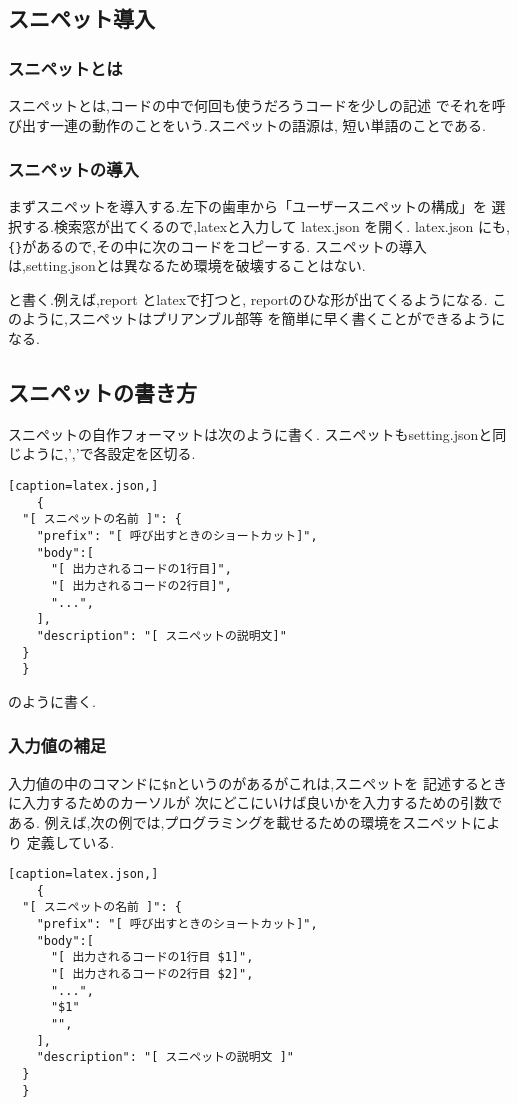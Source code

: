 \documentclass{ltjsarticle}
\begin{document}
\subsection{スニペット導入}
\subsubsection*{スニペットとは}
スニペットとは,コードの中で何回も使うだろうコードを少しの記述
でそれを呼び出す一連の動作のことをいう.スニペットの語源は,
短い単語のことである.
\subsubsection*{スニペットの導入}
まずスニペットを導入する.左下の歯車から「ユーザースニペットの構成」を
選択する.検索窓が出てくるので,latexと入力して latex.json を開く.
latex.json にも,\verb|{}|があるので,その中に次のコードをコピーする.
スニペットの導入は,setting.jsonとは異なるため環境を破壊することはない.


と書く.例えば,report とlatexで打つと,
reportのひな形が出てくるようになる.
このように,スニペットはプリアンブル部等
を簡単に早く書くことができるようになる.
\subsection{スニペットの書き方}
スニペットの自作フォーマットは次のように書く.
スニペットもsetting.jsonと同じように,','で各設定を区切る.
\begin{verbatim}[caption=latex.json,]
	{
  "[ スニペットの名前 ]": {
    "prefix": "[ 呼び出すときのショートカット]",
    "body":[
      "[ 出力されるコードの1行目]",
      "[ 出力されるコードの2行目]",
      "...",
    ],
    "description": "[ スニペットの説明文]"
  }
  }
\end{verbatim}
のように書く.
\subsubsection*{入力値の補足}
入力値の中のコマンドに\verb|$n|というのがあるがこれは,スニペットを
記述するときに入力するためのカーソルが
次にどこにいけば良いかを入力するための引数である.
例えば,次の例では,プログラミングを載せるための環境をスニペットにより
定義している.
\begin{verbatim}[caption=latex.json,]
	{
  "[ スニペットの名前 ]": {
    "prefix": "[ 呼び出すときのショートカット]",
    "body":[
      "[ 出力されるコードの1行目 $1]",
      "[ 出力されるコードの2行目 $2]",
      "...",
      "$1"
      "",
    ],
    "description": "[ スニペットの説明文 ]"
  }
  }
\end{verbatim}
\end{document}
